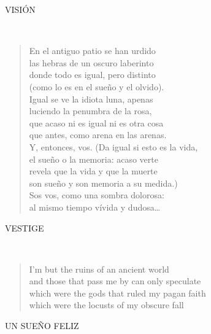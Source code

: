 \documentclass[a4paper, 12pt]{article}
\begin{document}
\pagebreak
\centerline{VISIÓN}
~ 

\begin{verse}
    
En el antiguo patio se han urdido\\
las hebras de un oscuro laberinto\\
donde todo es igual, pero distinto\\
(como lo es en el sueño y el olvido).\\
Igual se ve la idiota luna, apenas\\
luciendo la penumbra de la rosa,\\
que acaso ni es igual ni es otra cosa\\
que antes, como arena en las arenas.\\
Y, entonces, vos. (Da igual si esto es la vida,\\
el sueño o la memoria: acaso verte\\
revela que la vida y que la muerte\\
son sueño y son memoria a su medida.)\\
Sos vos, como una sombra dolorosa:\\
al mismo tiempo vívida y dudosa…\\
\end{verse}

\pagebreak
\centerline{VESTIGE}
~ 

\begin{verse}
I'm but the ruins of an ancient world\\
and those that pass me by can only speculate\\
which were the gods that ruled my pagan faith\\
which were the locusts of my obscure fall\\
\end{verse}

\pagebreak 
\centerline{UN SUEÑO FELIZ}
~ 
\end{document}
